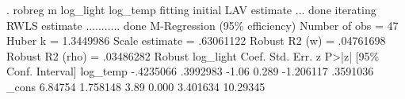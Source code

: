 . robreg m log_light log_temp
fitting initial LAV estimate ... done
iterating RWLS estimate ........... done
{\smallskip}
M-Regression (95\% efficiency)                   Number of obs     =         47
                                                  Huber k         =  1.3449986
                                                  Scale estimate  =  .63061122
                                                  Robust R2 (w)   =  .04761698
                                                  Robust R2 (rho) =  .03486282
{\smallskip}
             {\VBAR}               Robust
   log_light {\VBAR}      Coef.   Std. Err.      z    P>|z|     [95\% Conf. Interval]
    log_temp {\VBAR}  -.4235066   .3992983    -1.06   0.289    -1.206117    .3591036
       _cons {\VBAR}    6.84754   1.758148     3.89   0.000     3.401634    10.29345
{\smallskip}
